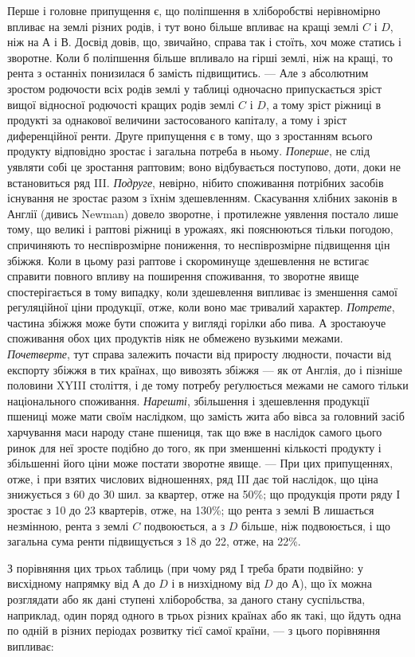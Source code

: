 
Перше і головне припущення є, що поліпшення в хліборобстві нерівномірно
впливає на землі різних родів, і тут воно більше впливає на кращі землі
$C$ і $D$, ніж на $А$ і $В$. Досвід довів, що, звичайно, справа так і стоїть, хоч може
статись і зворотне. Коли б поліпшення більше впливало на гірші землі, ніж на
кращі, то рента з останніх понизилася б замість підвищитись. — Але з абсолютним
зростом родючости всіх родів землі у таблиці одночасно припускається зріст
вищої відносної родючості кращих родів землі $C$ і $D$, а тому зріст ріжниці в продукті за однакової
величини застосованого капіталу, а тому і зріст диференційної ренти.
Друге припущення є в тому, що з зростанням всього продукту відповідно зростає і загальна потреба в
ньому. \emph{Поперше}, не слід уявляти собі це зростання раптовим; воно відбувається поступово, доти, доки
не встановиться ряд III. \emph{Подруге}, невірно, нібито споживання потрібних засобів існування не зростає разом з їхнім
здешевленням. Скасування хлібних законів в Англії (дивись Newman) довело зворотне, і протилежне
уявлення постало лише тому, що великі і раптові ріжниці в урожаях, які пояснюються тільки погодою,
спричиняють то неспіврозмірне пониження, то неспіврозмірне підвищення цін збіжжя.
Коли в цьому разі раптове і скороминуще здешевлення не встигає справити повного впливу на поширення
споживання, то зворотне явище спостерігається в тому випадку, коли здешевлення випливає із зменшення
самої регуляційної ціни продукції, отже, коли воно має тривалий характер. \emph{Потрете}, частина збіжжя
може бути спожита у вигляді горілки або пива. А зростаюуче споживання обох цих продуктів ніяк не
обмежено вузькими межами. \emph{Почетверте}, тут справа залежить почасти від приросту людности, почасти
від експорту збіжжя в тих країнах, що вивозять збіжжя — як от Англія, до і
пізніше половини XYIII століття, і де тому потребу реґулюється межами не самого
тільки національного споживання. \emph{Нарешті}, збільшення і здешевлення
продукції пшениці може мати своїм наслідком, що замість жита або вівса за
головний засіб харчування маси народу стане пшениця, так що вже в наслідок
самого цього ринок для неї зросте подібно до того, як при зменшенні кількості
продукту і збільшенні його ціни може постати зворотне явище. — При цих припущеннях, отже, і при
взятих числових відношеннях, ряд III дає той наслідок,
що ціна знижується з 60 до З0 шил. за квартер, отже на 50\%; що продукція проти ряду І зростає з 10
до 23 квартерів, отже, на 130\%; що рента з землі $В$ лишається незмінною, рента з землі $C$
подвоюється, а з $D$ більше, ніж подвоюється, і що загальна сума ренти підвищується з 18 до 22, отже, на 22\%.

З порівняння цих трьох таблиць (при чому ряд I треба брати подвійно:
у висхідному напрямку від $А$ до $D$ і в низхідному від $D$ до $А$), що їх можна
розглядати або як дані ступені хліборобства, за даного стану суспільства, наприклад,
один поряд одного в трьох різних країнах або як такі, що йдуть одна по одній в різних періодах
розвитку тієї самої країни, — з цього порівняння випливає:
